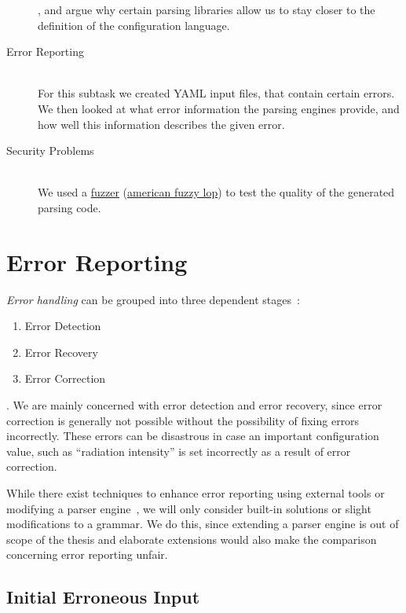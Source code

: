 \begin{description}
  \closeness*

  , and argue why certain parsing libraries allow us to stay closer to the definition of the configuration language.

  \item[Error Reporting]~\\[0.1cm]
  For this subtask we created YAML input files, that contain certain errors. We then looked at what error information the parsing engines provide, and how well this information describes the given error.

  \item[Security Problems]~\\[0.1cm]
  We used a \href{https://en.wikipedia.org/wiki/Fuzzing}{fuzzer} (\href{http://lcamtuf.coredump.cx/afl}{american fuzzy lop}) to test the quality of the generated parsing code.

\end{description}

\section{Error Reporting}

\emph{Error handling} can be grouped into three dependent stages~\cite{ruefenacht2016error}:

\begin{enumerate}
  \item Error Detection
  \item Error Recovery
  \item Error Correction
\end{enumerate}

. We are mainly concerned with error detection and error recovery, since error correction is generally not possible without the possibility of fixing errors incorrectly. These errors can be disastrous in case an important configuration value, such as “radiation intensity” is set incorrectly as a result of error correction.

While there exist techniques to enhance error reporting using external tools or modifying a parser engine~\cite{jeffery2003generating, cox2010errors}, we will only consider built-in solutions or slight modifications to a grammar. We do this, since extending a parser engine is out of scope of the thesis and elaborate extensions would also make the comparison concerning error reporting unfair.

\subsection{Initial Erroneous Input}

